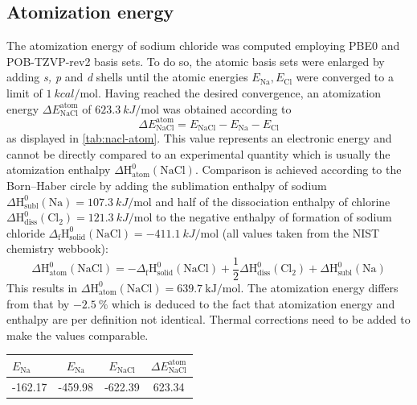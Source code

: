 \documentclass[a4paper,12pt]{scrartcl}
\begin{document}
\subsection{Atomization energy}
%
The atomization energy of sodium chloride was computed employing PBE0 and POB-TZVP-rev2 basis sets\autocite[]{pob-xzvp-rev2}. To do so, the atomic basis sets were enlarged by adding \textit{s, p} and \textit{d} shells until the atomic energies $ E_\mathrm{Na}, E_\mathrm{Cl} $ were converged to a limit of $ \SI{1}{kcal \per \mole} $. Having reached the desired convergence, an atomization energy $ \Delta E_\mathrm{NaCl}^\mathrm{atom} $ of $\SI{623.3}{kJ \per \mole} $ was obtained according to
%
\begin{equation}
	\Delta E_\mathrm{NaCl}^\mathrm{atom} = E_\mathrm{NaCl} - E_\mathrm{Na} - E_\mathrm{Cl}
\end{equation}
%
as displayed in \autoref{tab:nacl-atom}. This value represents an electronic energy and cannot be directly compared to an experimental quantity which is usually the atomization enthalpy $ \Delta \mathrm{H^{0}_{atom}(NaCl)} $. Comparison is achieved according to the Born--Haber circle by adding the sublimation enthalpy of sodium $ \Delta \mathrm{H^{0}_{subl}(Na)} = \SI{107.3}{kJ \per \mole} $ and half of the dissociation enthalpy of chlorine $ \Delta \mathrm{H^{0}_{diss}(Cl_2)} = \SI{121.3}{kJ \per \mole}  $ to the negative enthalpy of formation of sodium chloride $ \Delta \mathrm{_f H^{0}_{solid}(NaCl)} = \SI{-411.1}{kJ \per \mole}$ (all values taken from the NIST chemistry webbook\autocite[]{nist}):
%
\begin{equation}
	\Delta \mathrm{H^{0}_{atom}(NaCl)} = - \Delta \mathrm{_f H^{0}_{solid}(NaCl)} + \frac{1}{2}\Delta \mathrm{H^{0}_{diss}(Cl_2)} + \Delta \mathrm{H^{0}_{subl}(Na)}
\end{equation}
%
This results in $ \Delta \mathrm{H^{0}_{atom}(NaCl)} = \SI{639.7}{\kilo\joule\per\mole}$. The atomization energy differs from that by $ \SI{-2.5}{\percent} $ which is deduced to the fact that atomization energy and enthalpy are per definition not identical. Thermal corrections need to be added to make the values comparable.
%
\begin{table}
	\centering
	\label{tab:nacl-atom}
	\begin{tabular}{lccc}
		\toprule
		$ E_\mathrm{Na} $ & $ E_\mathrm{Na} $ & $ E_\mathrm{NaCl} $ & $ \Delta E_\mathrm{NaCl}^\mathrm{atom} $ \\
		\midrule
		-162.17           & -459.98           & -622.39             & 623.34                                   \\
		\bottomrule
	\end{tabular}
\end{table}
%
\end{document}
